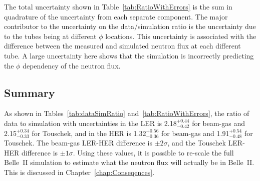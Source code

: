 	The total uncertainty shown in Table~\ref{tab:RatioWithErrors} is the sum in quadrature of the uncertainty from each separate component. The major contributor to the uncertainty on the data/simulation ratio is the uncertainty due to the tubes being at different $\phi$ locations. This uncertainty is associated with the difference between the measured and simulated neutron flux at each different \he tube. A large uncertainty here shows that the simulation is incorrectly predicting the $\phi$ dependency of the neutron flux.



\subsection{Summary}

As shown in Tables~\ref{tab:dataSimRatio} and~\ref{tab:RatioWithErrors}, the ratio of data to simulation with uncertainties in the LER is 2.18$^{+0.44}_{-0.42}$ for beam-gas and 2.15$^{+0.34}_{-0.33}$ for Touschek, and in the HER is 1.32$^{+0.56}_{-0.36}$ for beam-gas and 1.91$^{+0.54}_{-0.48}$ for Touschek. The beam-gas LER-HER difference is $\pm2\sigma$, and the Touschek LER-HER difference is $\pm1\sigma$. Using these values, it is possible to re-scale the full Belle~II simulation to estimate what the neutron flux will actually be in Belle~II. This is discussed in Chapter~\ref{chap:Conseqences}.






















